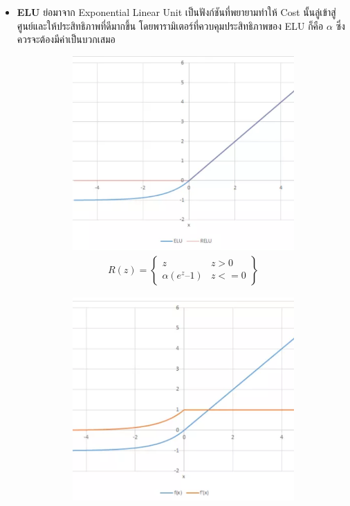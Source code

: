 \begin{itemize}
    \item \textbf{ELU} ย่อมาจาก Exponential Linear Unit เป็นฟังก์ชันที่พยายามทำให้ Cost นั้นลู่เข้าสู่ศูนย์และให้ประสิทธิภาพที่ดีมากขึ้น
    โดยพารามิเตอร์ที่ควบคุมประสิทธิภาพของ ELU ก็คือ $\alpha$ ซึ่งควรจะต้องมีค่าเป็นบวกเสมอ
    \begin{figure}[H]
        \centering
        \begin{subfigure}{0.5\textwidth}
            \centering
            \includegraphics[width=0.9\linewidth]{fig/actfunc_elu.png}
            \caption{%
                \begin{equation}
                    \begin{split}R(z) = \begin{Bmatrix} z & z > 0 \\
                        \alpha (e^z – 1) & z <= 0 \end{Bmatrix}\end{split}
                \end{equation}
            }
            \label{fig:actfunc_elu}
        \end{subfigure}%
        \begin{subfigure}{0.5\textwidth}
            \centering
            \includegraphics[width=0.9\linewidth]{fig/actfunc_elu_der.png}

\end{subfigure}
\end{figure}
\end{itemize}

